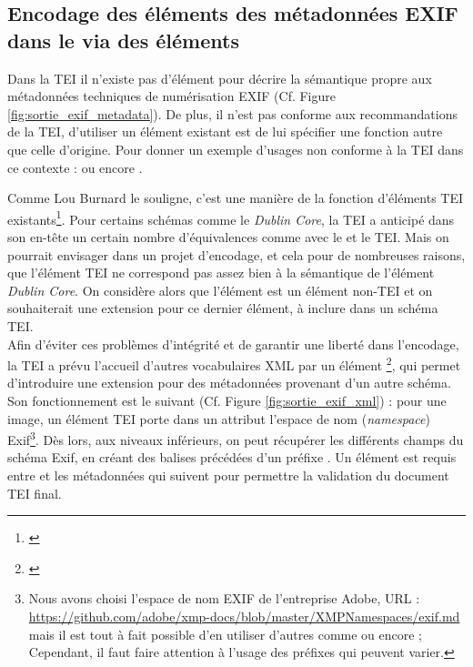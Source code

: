 \subsection{Encodage des éléments des métadonnées EXIF dans le  via des éléments }

Dans la TEI il n'existe pas d'élément pour décrire la sémantique propre aux métadonnées techniques de numérisation EXIF (Cf. Figure \ref{fig:sortie_exif_metadata}). De plus, il n'est pas conforme aux recommandations de la TEI, d'utiliser un élément existant est de lui spécifier une fonction autre que celle d'origine. Pour donner un exemple d'usages non conforme à la TEI dans ce contexte :  ou encore . 

Comme Lou Burnard le souligne, c'est une manière de  la fonction d'éléments TEI existants\footnote{\cite{burnard_what_2020}}. Pour certains schémas comme le \textit{Dublin Core}, la TEI a anticipé dans son en-tête un certain nombre d'équivalences comme avec le  et le  TEI. Mais on pourrait envisager dans un projet d'encodage, et cela pour de nombreuses raisons, que l'élément   TEI ne correspond pas assez bien à la sémantique de l'élément \textit{Dublin Core}. On considère alors que l'élément  est un élément non-TEI et on souhaiterait une extension pour ce dernier élément, à inclure dans un schéma TEI.\\

Afin d'éviter ces problèmes d'intégrité et de garantir une liberté dans l'encodage, la TEI a prévu l'accueil d'autres vocabulaires XML par un élément \footnote{\cite{tei_tei_nodate-16}}, qui permet d'introduire une extension pour des métadonnées provenant d'un autre schéma.\\

Son fonctionnement est le suivant (Cf. Figure \ref{fig:sortie_exif_xml}) : pour une image, un élément TEI  porte dans un attribut  l'espace de nom (\textit{namespace}) Exif\footnote{Nous avons choisi l'espace de nom EXIF de l'entreprise Adobe, URL : \url{https://github.com/adobe/xmp-docs/blob/master/XMPNamespaces/exif.md} mais il est tout à fait possible d'en utiliser d'autres comme  ou encore ; Cependant, il faut faire attention à l'usage des préfixes qui peuvent varier.}. Dès lors, aux niveaux inférieurs, on peut récupérer les différents champs du schéma Exif, en créant des balises précédées d'un préfixe . Un élément  est requis entre  et les métadonnées qui suivent pour permettre la validation du document TEI final.

